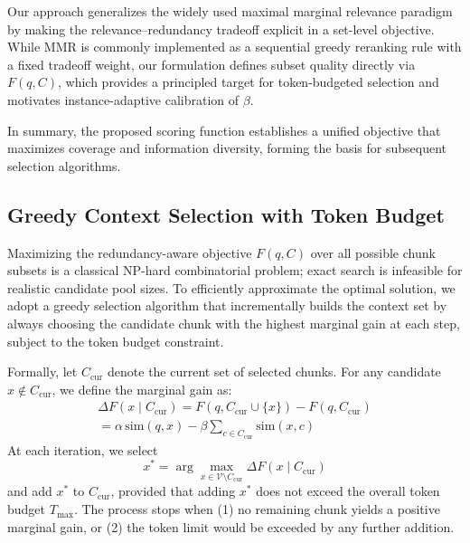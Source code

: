 \documentclass[11pt]{article}
\begin{document}
Our approach generalizes the widely used maximal marginal relevance paradigm by making the relevance–redundancy tradeoff explicit in a set-level objective. While MMR is commonly implemented as a sequential greedy reranking rule with a fixed tradeoff weight, our formulation defines subset quality directly via $F(q,C)$, which provides a principled target for token-budgeted selection and motivates instance-adaptive calibration of $\beta$.

In summary, the proposed scoring function establishes a unified objective that maximizes coverage and information diversity, forming the basis for subsequent selection algorithms.

\subsection{Greedy Context Selection with Token Budget}
Maximizing the redundancy-aware objective $F(q, C)$ over all possible chunk subsets is a classical NP-hard combinatorial problem; exact search is infeasible for realistic candidate pool sizes. To efficiently approximate the optimal solution, we adopt a greedy selection algorithm that incrementally builds the context set by always choosing the candidate chunk with the highest marginal gain at each step, subject to the token budget constraint.

Formally, let $C_{\text{cur}}$ denote the current set of selected chunks. For any candidate $x \notin C_{\text{cur}}$, we define the marginal gain as:
\begin{equation}
  \label{eq:example}
  \begin{matrix}
  \Delta F(x \mid C_{\text{cur}})= F(q, C_{\text{cur}} \cup \{x\}) - F(q, C_{\text{cur}}) \\= \alpha\,\mathrm{sim}(q, x) - \beta \sum_{c \in C_{\text{cur}}} \mathrm{sim}(x, c)
  \end{matrix}
\end{equation}
At each iteration, we select
\begin{equation}
\label{eq:example}
x^* = \arg\max_{x \in \mathcal{V} \setminus C_{\text{cur}}} \Delta F(x \mid C_{\text{cur}})
\end{equation}
and add $x^*$ to $C_{\text{cur}}$, provided that adding $x^*$ does not exceed the overall token budget $T_{\max}$. The process stops when (1) no remaining chunk yields a positive marginal gain, or (2) the token limit would be exceeded by any further addition.
\end{document}
